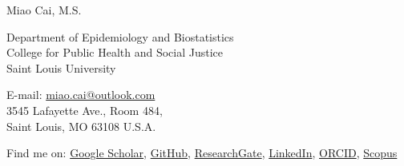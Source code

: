 \documentclass[11pt, a4paper]{article}
\begin{document}
	{\LARGE Miao Cai, M.S.}\\%
	
	
	
	\begin{minipage}[b]{0.65\linewidth}
		Department of Epidemiology and Biostatistics\\
		College for Public Health and Social Justice\\
		Saint Louis University
	\end{minipage}
	\hfill
	\begin{minipage}[b]{0.35\linewidth}
		E-mail: \href{mailto:miao.cai@outlook.com}{miao.cai@outlook.com}\\
		3545 Lafayette Ave., Room 484, \\
		Saint Louis, MO 63108 U.S.A.
	\end{minipage}

	Find me on: 
	\href{https://scholar.google.com/citations?user=kjFCzEkAAAAJ&hl=en}{Google Scholar},
	\href{https://github.com/caimiao0714}{GitHub},
	\href{https://www.researchgate.net/profile/Miao_Cai2}{ResearchGate}, \href{https://www.linkedin.com/in/miao-cai-7b5a62a3/}{LinkedIn},
	\href{https://orcid.org/0000-0003-0170-6905}{ORCID},  \href{https://www.scopus.com/authid/detail.uri?authorId=56824998300}{Scopus}
	
	
\end{document}
